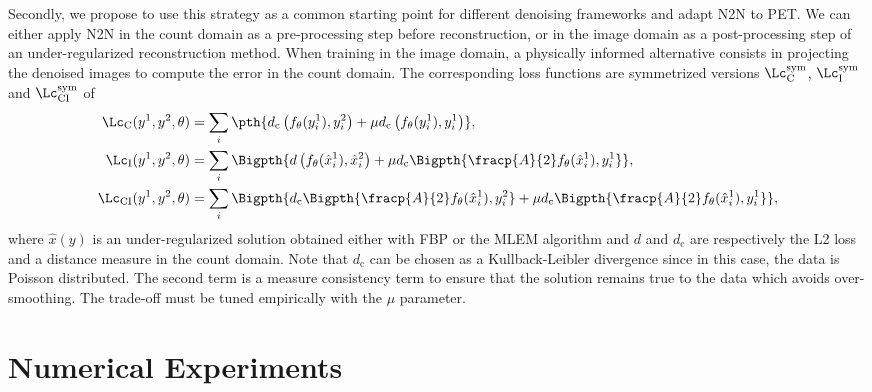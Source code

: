 \documentclass{IEEEtran}
\def\sym{^\text{sym}}
\def\ImDom{_\text{I}}
\def\CountDom{_\text{C}}
\def\CI{_\text{CI}}
\begin{document}
Secondly, we propose to use this strategy as a common starting point for different denoising frameworks and adapt N2N to PET. We can either apply N2N in the count domain as a pre-processing step before reconstruction, or in the image domain as a post-processing step of an under-regularized reconstruction method.
When training in the image domain, a physically informed alternative consists in projecting the denoised images to compute the error in the count domain.
The corresponding loss functions are symmetrized versions $\Lc\sym\CountDom$, $\Lc\sym\ImDom$ and $\Lc\sym\CI$ of
\begin{align*}
    \Lc\CountDom(y^1, y^2, \theta) &= \sum_i%
\pth{d_{\text{c}}\left(f_\theta(y_i^1), y_i^2\right) + \mu d_{\text{c}}\left(f_\theta(y_i^1), y_i^1\right)},
\\
\Lc\ImDom(y^1, y^2, \theta) &= \sum_i%
\Bigpth{d\left(f_\theta(\hat{x}_i^1), \hat{x}_i^2\right) + \mu d_{\text{c}}\Bigpth{\fracp{A}{2}f_\theta(\hat{x}_i^1), y_i^1}},
\\
\Lc\CI(y^1, y^2, \theta) &= \sum_i%
\Bigpth{d_{\text{c}}\Bigpth{\fracp{A}{2}f_\theta(\hat{x}_i^1), y_i^2} + \mu d_{\text{c}}\Bigpth{\fracp{A}{2}f_\theta(\hat{x}_i^1), y_i^1}},
\end{align*}
where $\hat{x}(y)$ is an under-regularized solution obtained either with FBP or the MLEM algorithm and $d$ and $d_{\text{c}}$  are respectively the L2 loss and a distance measure in the count domain.
Note that $d_{\text{c}}$ can be chosen as a Kullback-Leibler divergence since in this case, the data is Poisson distributed.
The second term is a measure consistency term to ensure that the solution remains true to the data  which avoids over-smoothing. The trade-off must be tuned empirically with the $\mu$ parameter.

\section{Numerical Experiments}
\end{document}
